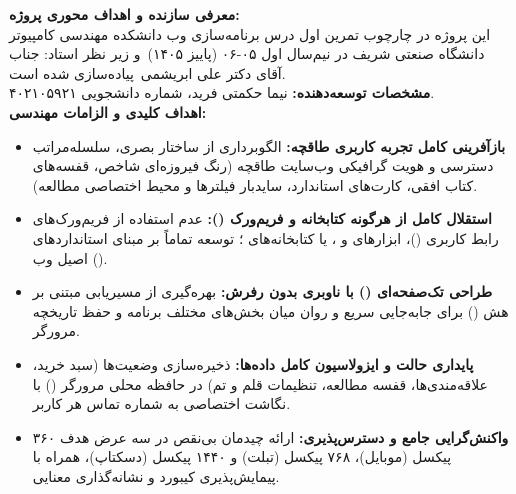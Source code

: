 \documentclass[12pt]{exam}
\newcommand{\term}{نیم‌سال اول ۰۵-۰۶ (پاییز ۱۴۰۵)}
\newcommand{\prof}{استاد: جناب آقای دکتر علی ابریشمی}
\begin{document}
\begin{questions}

\question
\textbf{معرفی سازنده و اهداف محوری پروژه:}
\\
این پروژه در چارچوب تمرین اول درس برنامه‌سازی وب دانشکده مهندسی کامپیوتر دانشگاه صنعتی شریف در \term\ و زیر نظر \prof\ پیاده‌سازی شده است.
\\
\textbf{مشخصات توسعه‌دهنده:} نیما حکمتی فرید، شماره دانشجویی ۴۰۲۱۰۵۹۲۱.
\\
\textbf{اهداف کلیدی و الزامات مهندسی:}
\begin{itemize}
    \item \textbf{بازآفرینی کامل تجربه کاربری طاقچه:} الگوبرداری از ساختار بصری، سلسله‌مراتب دسترسی و هویت گرافیکی وب‌سایت طاقچه (رنگ فیروزه‌ای شاخص، قفسه‌های کتاب افقی، کارت‌های استاندارد، سایدبار فیلترها و محیط اختصاصی مطالعه).
    \item \textbf{استقلال کامل از هرگونه کتابخانه و فریم‌ورک ():} عدم استفاده از فریم‌ورک‌های رابط کاربری ()، ابزارهای  و ، یا کتابخانه‌های ؛ توسعه تماماً بر مبنای استانداردهای اصیل وب ().
    \item \textbf{طراحی تک‌صفحه‌ای () با ناوبری بدون رفرش:} بهره‌گیری از مسیریابی مبتنی بر هش () برای جابه‌جایی سریع و روان میان بخش‌های مختلف برنامه و حفظ تاریخچه مرورگر.
    \item \textbf{پایداری حالت و ایزولاسیون کامل داده‌ها:} ذخیره‌سازی وضعیت‌ها (سبد خرید، علاقه‌مندی‌ها، قفسه مطالعه، تنظیمات قلم و تم) در حافظه محلی مرورگر () با نگاشت اختصاصی به شماره تماس هر کاربر.
    \item \textbf{واکنش‌گرایی جامع و دسترس‌پذیری:} ارائه چیدمان بی‌نقص در سه عرض هدف ۳۶۰ پیکسل (موبایل)، ۷۶۸ پیکسل (تبلت) و ۱۴۴۰ پیکسل (دسکتاپ)، همراه با پیمایش‌پذیری کیبورد و نشانه‌گذاری معنایی.
\end{itemize}


\end{questions}
\end{document}
